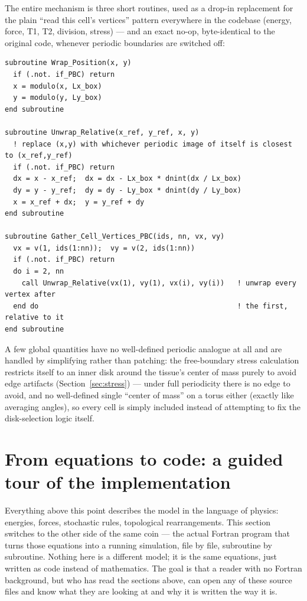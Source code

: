 \documentclass[11pt]{article}
\begin{document}
The entire mechanism is three short routines, used as a drop-in replacement for the
plain ``read this cell's vertices'' pattern everywhere in the codebase (energy, force,
T1, T2, division, stress) --- and an exact no-op, byte-identical to the original code,
whenever periodic boundaries are switched off:
\begin{lstlisting}[caption={The complete PBC machinery (from \texttt{Geometry.f90}).
\texttt{Gather\_\allowbreak Cell\_\allowbreak Vertices\_\allowbreak PBC} is called everywhere a cell's vertex list is
needed, in place of the old raw \texttt{v(1,inn(1:nn,ic))} pattern.}]
subroutine Wrap_Position(x, y)
  if (.not. if_PBC) return
  x = modulo(x, Lx_box)
  y = modulo(y, Ly_box)
end subroutine

subroutine Unwrap_Relative(x_ref, y_ref, x, y)
  ! replace (x,y) with whichever periodic image of itself is closest to (x_ref,y_ref)
  if (.not. if_PBC) return
  dx = x - x_ref;  dx = dx - Lx_box * dnint(dx / Lx_box)
  dy = y - y_ref;  dy = dy - Ly_box * dnint(dy / Ly_box)
  x = x_ref + dx;  y = y_ref + dy
end subroutine

subroutine Gather_Cell_Vertices_PBC(ids, nn, vx, vy)
  vx = v(1, ids(1:nn));  vy = v(2, ids(1:nn))
  if (.not. if_PBC) return
  do i = 2, nn
    call Unwrap_Relative(vx(1), vy(1), vx(i), vy(i))   ! unwrap every vertex after
  end do                                               ! the first, relative to it
end subroutine
\end{lstlisting}
A few global quantities have no well-defined periodic analogue at all and are handled
by simplifying rather than patching: the free-boundary stress calculation restricts
itself to an inner disk around the tissue's center of mass purely to avoid edge
artifacts (Section~\ref{sec:stress}) --- under full periodicity there is no edge to
avoid, and no well-defined single ``center of mass'' on a torus either (exactly like
averaging angles), so every cell is simply included instead of attempting to fix the
disk-selection logic itself.

\section{From equations to code: a guided tour of the implementation}
\label{sec:code-tour}

Everything above this point describes the model in the language of physics: energies,
forces, stochastic rules, topological rearrangements. This section switches to the
other side of the same coin --- the actual Fortran program that turns those equations
into a running simulation, file by file, subroutine by subroutine. Nothing here is a
different model; it is the same equations, just written as code instead of
mathematics. The goal is that a reader with no Fortran background, but who has read
the sections above, can open any of these source files and know what they are looking
at and why it is written the way it is.
\end{document}
